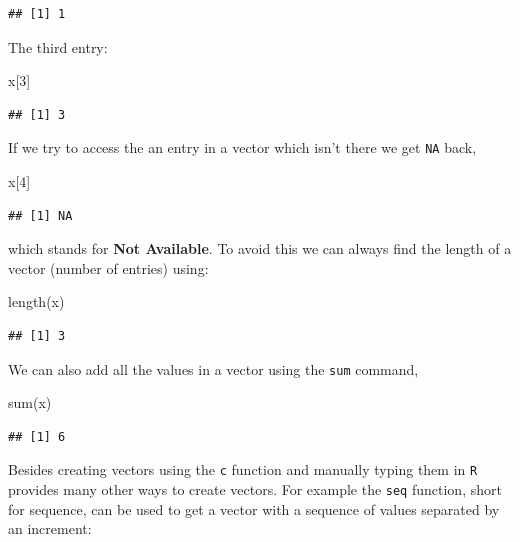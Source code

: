 \documentclass[
]{book}
\newenvironment{Shaded}{\begin{snugshade}}{\end{snugshade}}
\newcommand{\DecValTok}[1]{\textcolor[rgb]{0.00,0.00,0.81}{#1}}
\newcommand{\FunctionTok}[1]{\textcolor[rgb]{0.00,0.00,0.00}{#1}}
\newcommand{\NormalTok}[1]{#1}
\theoremstyle{definition}
\theoremstyle{definition}
\theoremstyle{definition}
\theoremstyle{definition}
\theoremstyle{remark}
\begin{document}
\begin{verbatim}
## [1] 1
\end{verbatim}

The third entry:

\begin{Shaded}
\begin{Highlighting}[]
\NormalTok{x[}\DecValTok{3}\NormalTok{]}
\end{Highlighting}
\end{Shaded}

\begin{verbatim}
## [1] 3
\end{verbatim}

If we try to access the an entry in a vector which isn't there we get \texttt{NA} back,

\begin{Shaded}
\begin{Highlighting}[]
\NormalTok{x[}\DecValTok{4}\NormalTok{]}
\end{Highlighting}
\end{Shaded}

\begin{verbatim}
## [1] NA
\end{verbatim}

which stands for \textbf{Not Available}. To avoid this we can always find the length of a vector (number of entries) using:

\begin{Shaded}
\begin{Highlighting}[]
\FunctionTok{length}\NormalTok{(x)}
\end{Highlighting}
\end{Shaded}

\begin{verbatim}
## [1] 3
\end{verbatim}

We can also add all the values in a vector using the \texttt{sum} command,

\begin{Shaded}
\begin{Highlighting}[]
\FunctionTok{sum}\NormalTok{(x)}
\end{Highlighting}
\end{Shaded}

\begin{verbatim}
## [1] 6
\end{verbatim}

Besides creating vectors using the \texttt{c} function and manually typing them in \texttt{R} provides many other ways to create vectors.
For example the \texttt{seq} function, short for sequence, can be used to get a vector with a sequence of values separated by an increment:
\end{document}
